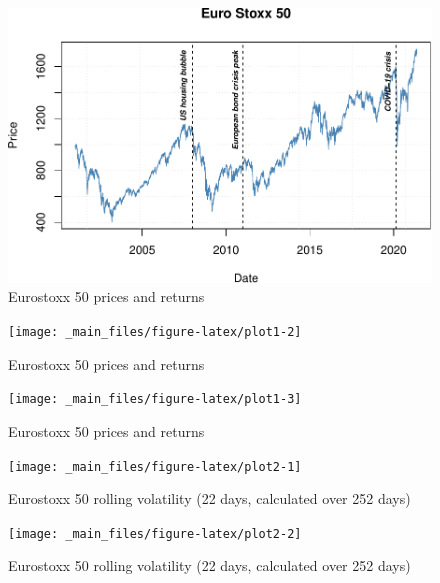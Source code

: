 \documentclass[a4paper, twoside]{templates/ociamthesis}
\begin{document}
\begin{figure}

{\centering \includegraphics[width=0.75\linewidth]{_main_files/figure-latex/plot1-1} 

}

\caption{Eurostoxx 50 prices and returns}\label{fig:plot1-1}
\end{figure}
\begin{figure}

{\centering \texttt{[image: \_main\_files/figure-latex/plot1-2]} 

}

\caption{Eurostoxx 50 prices and returns}\label{fig:plot1-2}
\end{figure}
\begin{figure}

{\centering \texttt{[image: \_main\_files/figure-latex/plot1-3]} 

}

\caption{Eurostoxx 50 prices and returns}\label{fig:plot1-3}
\end{figure}

\begin{figure}

{\centering \texttt{[image: \_main\_files/figure-latex/plot2-1]} 

}

\caption{Eurostoxx 50 rolling volatility (22 days, calculated over 252 days)}\label{fig:plot2-1}
\end{figure}
\begin{figure}

{\centering \texttt{[image: \_main\_files/figure-latex/plot2-2]} 

}

\caption{Eurostoxx 50 rolling volatility (22 days, calculated over 252 days)}\label{fig:plot2-2}
\end{figure}
\end{document}
